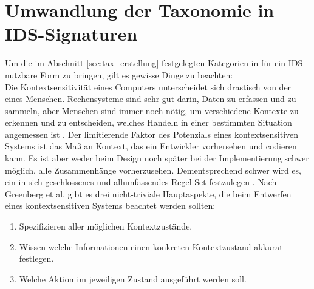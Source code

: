 \section{Umwandlung der Taxonomie in IDS-Signaturen} 
Um die im Abschnitt \ref{sec:tax_erstellung} festgelegten Kategorien in für ein IDS nutzbare Form zu bringen, gilt es gewisse Dinge zu beachten:\\ Die Kontextsensitivität eines Computers unterscheidet sich drastisch von der eines Menschen. Rechensysteme sind sehr gut darin, Daten zu erfassen und zu sammeln, aber Menschen sind immer noch nötig, um verschiedene Kontexte zu erkennen und zu entscheiden, welches Handeln in einer bestimmten Situation angemessen ist \cite{dey_understanding_2001}.
Der limitierende Faktor des Potenzials eines kontextsensitiven Systems ist das Maß an Kontext, das ein Entwickler vorhersehen und codieren kann.
Es ist aber weder beim Design noch später bei der Implementierung schwer möglich, alle Zusammenhänge vorherzusehen. Dementsprechend schwer wird es, ein in sich geschlossenes und allumfassendes Regel-Set festzulegen \cite{perera_context_2014}.
Nach Greenberg et al. \cite{greenberg2001context} gibt es drei nicht-triviale Hauptaspekte, die beim Entwerfen eines kontextsensitiven Systems beachtet werden sollten:
\begin{enumerate}
\item{Spezifizieren aller möglichen Kontextzustände.}
\item{Wissen welche Informationen einen konkreten Kontextzustand akkurat festlegen.}
\item{Welche Aktion im jeweiligen Zustand ausgeführt werden soll.}
\end{enumerate}

